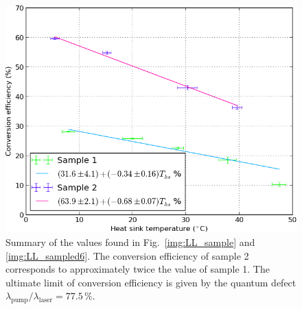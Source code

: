 \begin{figure}
\centering
\includegraphics[width=14.5cm]{img/conversion_temp.png}
\caption{Summary of the values found in
Fig.~\ref{img:LL_sample} and \ref{img:LL_sampled6}.
The conversion efficiency of sample 2
corresponds to approximately twice
the value of sample 1.
The ultimate limit of conversion efficiency
is given by the quantum defect
$\lambda_\mathrm{pump}/\lambda_\mathrm{laser}=77.5\,\%.$}
\label{img:conversion_temp}
\end{figure}